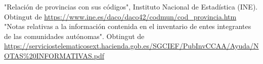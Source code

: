 \documentclass[12pt]{article}
\begin{document}
\newpage
\begin{thebibliography}{9}
    "Relación de provincias con sus códigos", Instituto Nacional de Estadística (INE). Obtingut de \url{https://www.ine.es/daco/daco42/codmun/cod_provincia.htm}
    "Notas relativas a la información contenida en el inventario de entes integrantes de las comunidades autónomas". Obtingut de \url{https://serviciostelematicosext.hacienda.gob.es/SGCIEF/PubInvCCAA/Ayuda/NOTAS\%20INFORMATIVAS.pdf}
\end{thebibliography}
\end{document}
